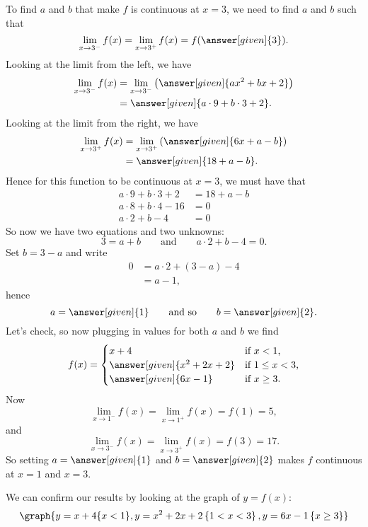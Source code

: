 \documentclass{ximera}
\begin{document}
\begin{example}
\begin{explanation}
To find $a$ and $b$ that make $f$ is continuous at $x=3$, we need to
find $a$ and $b$ such that
\[
\lim_{x\to 3^-} f(x) =\lim_{x\to 3^+}f(x) =f(\answer[given]{3}).
\]
Looking at the limit from the left, we have
\begin{align*}
  \lim_{x\to 3^-} f(x) &= \lim_{x\to 3^-} \left(\answer[given]{ax^2+bx+2}\right) \\
  &=\answer[given]{a\cdot 9 + b\cdot 3 + 2}.
\end{align*}
Looking at the limit from the right, we have
\begin{align*}
  \lim_{x\to 3^+} f(x) &= \lim_{x\to 3^+} \left(\answer[given]{6x+a-b}\right) \\
  &= \answer[given]{18+a-b}.
\end{align*}
Hence for this function to be continuous at $x=3$, we must have that
\begin{align*}
  a\cdot 9 + b\cdot 3 + 2 &= 18+a-b\\
  a\cdot 8 + b\cdot 4 -16 &= 0\\
  a\cdot 2 + b -4 &= 0
\end{align*}
So now we have two equations and two unknowns:
\[
 3=a+b \qquad\text{and}\qquad a\cdot 2 + b -4 = 0.
 \]
 Set $b = 3-a$ and write
 \begin{align*}
   0&= a\cdot 2 + (3-a) -4 \\
   &= a -1,
 \end{align*}
 hence
 \[
 a=\answer[given]{1}\qquad\text{and so}\qquad b =\answer[given]{2}.
 \]
 Let's check, so now plugging in values for both $a$ and $b$ we find
 \[
 f(x) = 
 \begin{cases}
   x+4 &\text{if $x<1$,}\\
   \answer[given]{x^2+2x+2} &\text{if $1\le x< 3$,}\\
   \answer[given]{6x-1} &\text{if $x\ge 3$.}
\end{cases}
 \]
 Now
 \[
 \lim_{x\to 1^-} f(x) =\lim_{x\to 1^+}f(x) =f(1) =  5,
 \]
 and
 \[
 \lim_{x\to 3^-} f(x) =\lim_{x\to 3^+}f(x) =f(3) = 17.  
 \]
 So setting $a= \answer[given]{1}$ and $b=\answer[given]{2}$ makes $f$ continuous at $x=1$ and $x=3$.
 \begin{onlineOnly}
   We can confirm our results by looking at the graph of $y=f(x)$:
   \[
   \graph{y=x+4\{x<1\},y=x^2+2x+2\left\{1< x<3\right\},y=6x-1\left\{x \geq 3\right\}} 
   \]
 \end{onlineOnly}
\end{explanation}
\end{example}
\end{document}
